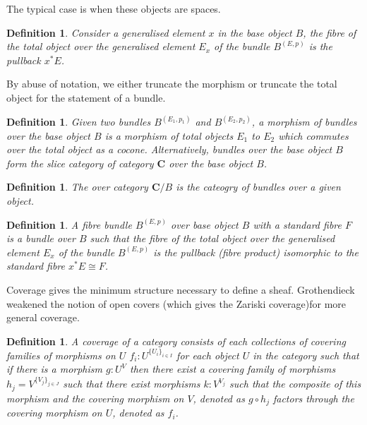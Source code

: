 \documentclass{tufte-book}
\newtheorem{definition}[theorem]{Definition}
\begin{document}
The typical case is when these objects are spaces.

\begin{definition}
	Consider a generalised element $x$ in the base object $B$, the fibre of the total object over the generalised element $E_x$ of the bundle $B^{(E, p)}$ is the pullback $x^*E$.
\end{definition}

By abuse of notation, we either truncate the morphism or truncate the total object for the statement of a bundle.

\begin{definition}
	Given two bundles $B^{(E_1, p_1)}$ and $B^{(E_2, p_2)}$, a morphism of bundles over the base object $B$ is a morphism of total objects $E_1$ to $E_2$ which commutes over the total object as a cocone. Alternatively, bundles over the base object $B$ form the slice category of category $\mathbf{C}$ over the base object $B$. 
\end{definition}

\begin{definition}
	The over category $\mathbf{C} / B$ is the cateogry of bundles over a given object.
\end{definition}

\begin{definition}
	A fibre bundle $B^{(E, p)}$ over base object $B$ with a standard fibre $F$ is a bundle over $B$ such that the fibre of the total object over the generalised element $E_x$ of the bundle $B^{(E, p)}$ is the pullback (fibre product) isomorphic to the standard fibre $x^*E \cong F$.
\end{definition}

Coverage gives the minimum structure necessary to define a sheaf. Grothendieck weakened the notion of open covers (which gives the Zariski coverage)for more general coverage.

\begin{definition}
	A coverage of a category consists of each collections of covering families of morphisms on $U$ $f_i : U^{\{U_i\}_{i \in I}}$ for each object $U$ in the category such that if there is a morphism $g : U^V$ then there exist a covering family of morphisms $h_j = V^{\{V_j\}_{j \in J}}$
	such that there exist morphisms $k : V^{V_j}$ such that the composite of this morphism and the covering morphism on $V$, denoted as $g \circ h_j$ factors through the covering morphism on $U$, denoted as $f_i$.
\end{definition}
\end{document}
